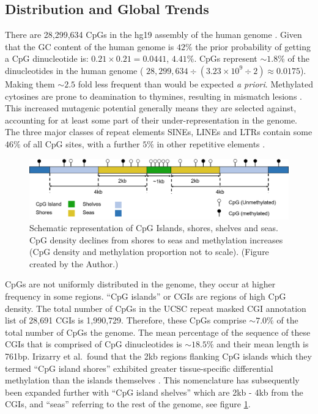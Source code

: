 \documentclass[]{book}
\begin{document}
\hypertarget{distribution-and-global-trends}{%
\subsection{Distribution and Global Trends}\label{distribution-and-global-trends}}

There are 28,299,634 CpGs \citep{Luo2014} in the hg19 assembly of the human genome \citep{Lander2001}. Given that the GC content of the human genome is \(42\%\) the prior probability of getting a CpG dinucleotide is: \(0.21 \times 0.21 = 0.0441\), \(4.41\%\). CpGs represent \(\sim1.8\%\) of the dinucleotides in the human genome ( \(28,299,634 \div (3.23\times10^9\div2) \approx 0.0175\)). Making them \(\sim2.5\) fold less frequent than would be expected \emph{a priori}. Methylated cytosines are prone to deamination to thymines, resulting in mismatch lesions \citep{Duncan1980}. This increased mutagenic potential generally means they are selected against, accounting for at least some part of their under-representation in the genome. The three major classes of repeat elements SINEs, LINEs and LTRs contain some \(46\%\) of all CpG sites, with a further \(5\%\) in other repetitive elements \citep{Luo2014}.

\begin{figure}
\includegraphics[width=26.28in]{figs/CGI-Shores-Shelves-Seas_2} \caption{Schematic representation of CpG Islands, shores, shelves and seas. CpG density declines from shores to seas and methylation increases (CpG density and methylation proportion not to scale). (Figure created by the Author.)}\label{fig:CGIs}
\end{figure}



CpGs are not uniformly distributed in the genome, they occur at higher frequency in some regions. ``CpG islands'' or CGIs are regions of high CpG density. The total number of CpGs in the UCSC repeat masked CGI annotation list of 28,691 CGIs is 1,990,729. Therefore, these CpGs comprise \(\sim7.0\%\) of the total number of CpGs the genome. The mean percentage of the sequence of these CGIs that is comprised of CpG dinucleotides is \(\sim18.5\%\) and their mean length is 761bp. Irizarry et al.~found that the 2kb regions flanking CpG islands which they termed ``CpG island shores'' exhibited greater tissue-specific differential methylation than the islands themselves \citep{Irizarry2009}. This nomenclature has subsequently been expanded further with ``CpG island shelves'' which are 2kb - 4kb from the CGIs, and ``seas'' referring to the rest of the genome, see figure \ref{fig:CGIs}.
\end{document}
